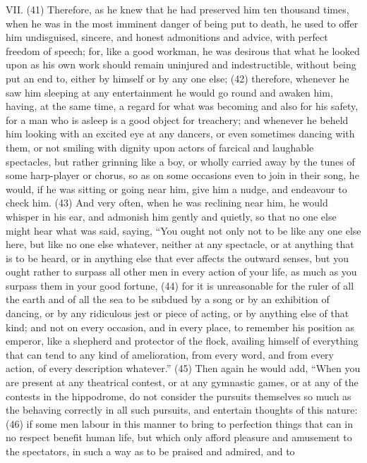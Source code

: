 VII. (41) Therefore, as he knew that he had preserved him ten thousand times, when he was in the
most imminent danger of being put to death, he used to offer him undisguised, sincere, and honest
admonitions and advice, with perfect freedom of speech; for, like a good workman, he was
desirous that what he looked upon as his own work should remain uninjured and indestructible,
without being put an end to, either by himself or by any one else; (42) therefore, whenever he saw
him sleeping at any entertainment he would go round and awaken him, having, at the same time, a
regard for what was becoming and also for his safety, for a man who is asleep is a good object for
treachery; and whenever he beheld him looking with an excited eye at any dancers, or even
sometimes dancing with them, or not smiling with dignity upon actors of farcical and laughable
spectacles, but rather grinning like a boy, or wholly carried away by the tunes of some harp-player
or chorus, so as on some occasions even to join in their song, he would, if he was sitting or going
near him, give him a nudge, and endeavour to check him. (43) And very often, when he was
reclining near him, he would whisper in his ear, and admonish him gently and quietly, so that no one
else might hear what was said, saying, ``You ought not only not to be like any one else here, but like
no one else whatever, neither at any spectacle, or at anything that is to be heard, or in anything
else that ever affects the outward senses, but you ought rather to surpass all other men in every
action of your life, as much as you surpass them in your good fortune, (44) for it is unreasonable
for the ruler of all the earth and of all the sea to be subdued by a song or by an exhibition of
dancing, or by any ridiculous jest or piece of acting, or by anything else of that kind; and not on
every occasion, and in every place, to remember his position as emperor, like a shepherd and
protector of the flock, availing himself of everything that can tend to any kind of amelioration, from
every word, and from every action, of every description whatever.'' (45) Then again he would add,
``When you are present at any theatrical contest, or at any gymnastic games, or at any of the
contests in the hippodrome, do not consider the pursuits themselves so much as the behaving
correctly in all such pursuits, and entertain thoughts of this nature: (46) if some men labour in this
manner to bring to perfection things that can in no respect benefit human life, but which only afford
pleasure and amusement to the spectators, in such a way as to be praised and admired, and to

